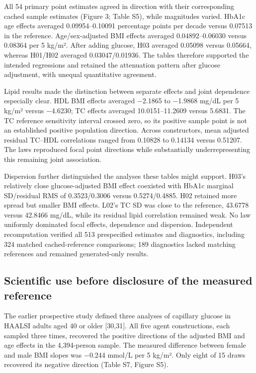 \documentclass[sigconf,anonymous,review]{acmart}
\begin{document}
All 54 primary point estimates agreed in direction with their corresponding cached sample estimates (Figure 3; Table S5), while magnitudes varied. HbA1c age effects averaged 0.09954–\allowbreak{}0.10091 percentage points per decade versus 0.07513 in the reference. Age/\allowbreak{}sex-adjusted BMI effects averaged 0.04892–\allowbreak{}0.06030 versus 0.08364 per 5 kg/\allowbreak{}m². After adding glucose, H03 averaged 0.05098 versus 0.05664, whereas H01/\allowbreak{}H02 averaged 0.03047/\allowbreak{}0.01936. The tables therefore supported the intended regressions and retained the attenuation pattern after glucose adjustment, with unequal quantitative agreement.


Lipid results made the distinction between separate effects and joint dependence especially clear. HDL BMI effects averaged −2.1865 to −1.9868 mg/\allowbreak{}dL per 5 kg/\allowbreak{}m² versus −4.6230; TC effects averaged 10.0151–\allowbreak{}11.2609 versus 5.6831. The TC reference sensitivity interval crossed zero, so its positive sample point is not an established positive population direction. Across constructors, mean adjusted residual TC–\allowbreak{}HDL correlations ranged from 0.10828 to 0.14134 versus 0.51207. The laws reproduced focal point directions while substantially underrepresenting this remaining joint association.


Dispersion further distinguished the analyses these tables might support. H03's relatively close glucose-adjusted BMI effect coexisted with HbA1c marginal SD/\allowbreak{}residual RMS of 0.3523/\allowbreak{}0.3006 versus 0.5274/\allowbreak{}0.4885. H02 retained more spread but smaller BMI effects. L02's TC SD was close to the reference, 43.6778 versus 42.8466 mg/\allowbreak{}dL, while its residual lipid correlation remained weak. No law uniformly dominated focal effects, dependence and dispersion. Independent recomputation verified all 513 prespecified estimates and diagnostics, including 324 matched cached-reference comparisons; 189 diagnostics lacked matching references and remained generated-only results.


\subsection{Scientific use before disclosure of the measured reference}

The earlier prospective study defined three analyses of capillary glucose in HAALSI adults aged 40 or older [30,31]. All five agent constructions, each sampled three times, recovered the positive directions of the adjusted BMI and age effects in the 4,394-person sample. The measured difference between female and male BMI slopes was −0.244 mmol/\allowbreak{}L per 5 kg/\allowbreak{}m². Only eight of 15 draws recovered its negative direction (Table S7, Figure S5).
\end{document}
